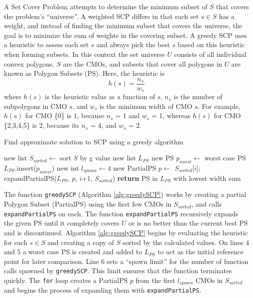 A Set Cover Problem attempts to determine the minimum subset of $S$ that covers the problem's ``universe''.
A weighted SCP differs in that each set $s \in S$ has a weight, and instead of finding the minimum subset that covers the universe, the goal is to minimize the sum of weights in the covering subset.
A greedy SCP uses a heuristic to assess each set $s$ and always pick the best $s$ based on this heuristic when forming subsets.
In this context the set universe $U$ consists of all individual convex polygons, $S$ are the CMOs, and subsets that cover all polygons in $U$ are known as Polygon Subsets (PS).
Here, the heuristic is
\begin{equation*}
	h(s) = \frac{n_s}{w_s}
\end{equation*}
where $h(s)$ is the heuristic value as a function of $s$, $n_s$ is the number of subpolygons in CMO $s$, and $w_s$ is the minimum width of CMO $s$.
For example, $h(s)$ for CMO \{0\} is 1, because $n_s$ = 1 and $w_s$ = 1, whereas $h(s)$ for CMO \{2,3,4,5\} is 2, because its $n_s$ = 4, and $w_s$ = 2.

\begin{algorithm}[htb]
\caption{Find approximate solution to SCP using a greedy algorithm}\label{alg:greedySCP}
\begin{algorithmic}[1]
	\State new list $S_{sorted} \leftarrow$ sort $S$ by g value
	\State new list $L_{PS}$ 
	\State new PS $p_{worst} \leftarrow$ worst case PS 
	\State $L_{PS}$.insert($p_{worst}$)
	\State new int $l_{spawn} \leftarrow 4$ 
		\State new PartialPS $p \leftarrow$ $S_{sorted}$[$i$];
		\State expandPartialPS($L_{PS}$, $p$, $i$+1, $S_{sorted}$)
	\EndFor
	\State \textbf{return} PS in $L_{PS}$ with lowest width sum
\EndFunction
\end{algorithmic}
\end{algorithm}

The function \verb|greedySCP| (Algorithm \ref{alg:greedySCP}) works by creating a partial Polygon Subset (PartialPS) using the first few CMOs in $S_{sorted}$, and calls \verb|expandPartialPS| on each.
The function \verb|expandPartialPS| recursively expands the given PS until it completely covers $U$ or is no better than the current best PS and is discontinued.
Algorithm \ref{alg:greedySCP} begins by evaluating the heuristic for each $s \in S$ and creating a copy of $S$ sorted by the calculated values.
On lines 4 and 5 a worst case PS is created and added to $L_{PS}$ to act as the initial reference point for later comparison.
Line 6 sets a ``spawn limit'' for the number of function calls spawned by \verb|greedySCP|.
This limit ensures that the function terminates quickly.
The \verb|for| loop creates a PartialPS $p$ from the first $l_{spawn}$ CMOs in $S_{sorted}$ and begins the process of expanding them with \verb|expandPartialPS|.

